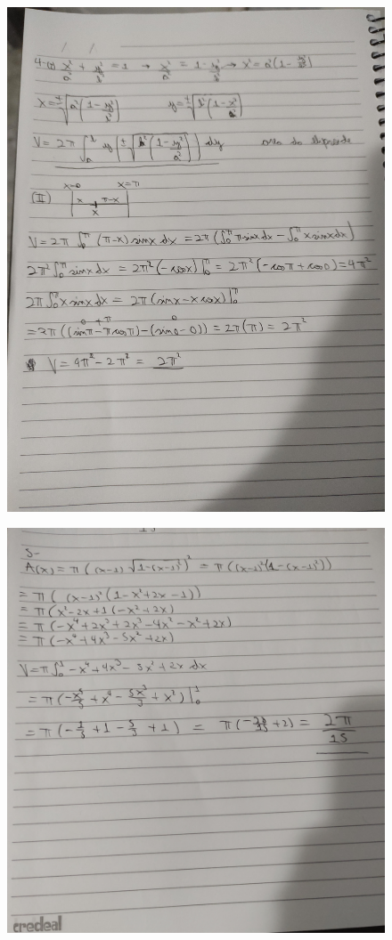 \documentclass[12pt]{article}
\begin{document}
\begin{figure}[h!]
	\includegraphics[scale=0.14]{q4}
\end{figure}

\begin{figure}[h!]
	\includegraphics[scale=0.3]{q5}
\end{figure}
	

	
	
	
	
	
\end{document}

